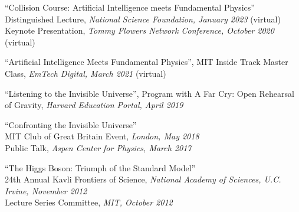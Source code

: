 \bbl

\item ``Collision Course: Artificial Intelligence meets Fundamental Physics''
\\ \sh Distinguished Lecture, \emph{National Science Foundation, January 2023} (virtual)
\\ \sh Keynote Presentation, \emph{Tommy Flowers Network Conference, October 2020} (virtual)

\item ``Artificial Intelligence Meets Fundamental Physics'', MIT Inside Track Master Class, \emph{EmTech Digital, March 2021} (virtual)

\item ``Listening to the Invisible Universe'', Program with A Far Cry: Open Rehearsal of Gravity, \emph{Harvard Education Portal, April 2019}

\item ``Confronting the Invisible Universe''
\\ \sh MIT Club of Great Britain Event, \emph{London, May 2018}
\\ \sh Public Talk, \emph{Aspen Center for Physics, March 2017}

\item ``The Higgs Boson:  Triumph of the Standard Model''
\\ \sh 24th Annual Kavli Frontiers of Science, \emph{National Academy of Sciences, U.C. Irvine, November 2012}
\\ \sh Lecture Series Committee, \emph{MIT, October 2012}

\el

